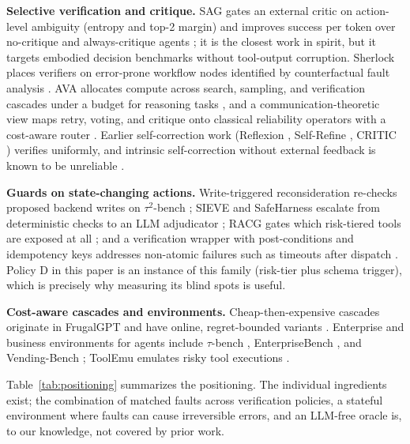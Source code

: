 \documentclass[conference]{IEEEtran}
\begin{document}
\textbf{Selective verification and critique.}
SAG gates an external critic on action-level ambiguity (entropy and top-2 margin) and
improves success per token over no-critique and always-critique agents
\cite{park2026sag}; it is the closest work in spirit, but it targets embodied decision
benchmarks without tool-output corruption. Sherlock places verifiers on error-prone workflow
nodes identified by counterfactual fault analysis \cite{ro2025sherlock}. AVA allocates compute
across search, sampling, and verification cascades under a budget for reasoning tasks
\cite{patel2026ava}, and a communication-theoretic view maps retry, voting, and critique onto
classical reliability operators with a cost-aware router \cite{omidvar2026comm}. Earlier
self-correction work (Reflexion \cite{shinn2023reflexion}, Self-Refine
\cite{madaan2023selfrefine}, CRITIC \cite{gou2024critic}) verifies uniformly, and intrinsic
self-correction without external feedback is known to be unreliable \cite{huang2024cannot}.

\textbf{Guards on state-changing actions.}
Write-triggered reconsideration re-checks proposed backend writes on $\tau^2$-bench
\cite{chen2026reconsider}; SIEVE and SafeHarness escalate from deterministic checks to an LLM
adjudicator \cite{sieve2025,safeharness2026}; RACG gates which risk-tiered tools are exposed
at all \cite{racg2026}; and a verification wrapper with post-conditions and idempotency keys
addresses non-atomic failures such as timeouts after dispatch \cite{mansoor2026verifiedtools}.
Policy D in this paper is an instance of this family (risk-tier plus schema trigger), which is
precisely why measuring its blind spots is useful.

\textbf{Cost-aware cascades and environments.}
Cheap-then-expensive cascades originate in FrugalGPT \cite{chen2023frugalgpt} and have online,
regret-bounded variants \cite{omvv2026}. Enterprise and business environments for agents
include $\tau$-bench \cite{yao2024taubench}, EnterpriseBench \cite{enterprisebench}, and
Vending-Bench \cite{backlund2025vending}; ToolEmu emulates risky tool executions
\cite{ruan2024toolemu}.

Table~\ref{tab:positioning} summarizes the positioning. The individual ingredients exist; the
combination of matched faults across verification policies, a stateful environment where
faults can cause irreversible errors, and an LLM-free oracle is, to our knowledge, not
covered by prior work.
\end{document}
